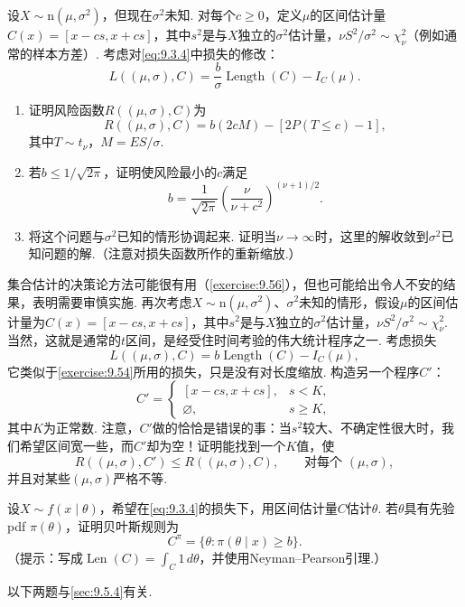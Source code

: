 \begin{exercise}\label{exercise:9.54}
设$X\sim\mathrm n(\mu,\sigma^2)$，但现在$\sigma^2$未知. 对每个$c\ge0$，定义$\mu$的区间估计量$C(x)=[x-cs,x+cs]$，其中$s^2$是与$X$独立的$\sigma^2$估计量，$\nu S^2/\sigma^2\sim\chi^2_\nu$（例如通常的样本方差）. 考虑对\eqref{eq:9.3.4}中损失的修改：
$$L((\mu,\sigma),C)=\frac b\sigma\operatorname{Length}(C)-I_C(\mu).$$
\begin{enumerate}
\item 证明风险函数$R((\mu,\sigma),C)$为
$$R((\mu,\sigma),C)=b(2cM)-[2P(T\le c)-1],$$
其中$T\sim t_\nu$，$M=ES/\sigma$.
\item 若$b\le1/\sqrt{2\pi}$，证明使风险最小的$c$满足
$$b=\frac1{\sqrt{2\pi}}\left(\frac\nu{\nu+c^2}\right)^{(\nu+1)/2}.$$
\item 将这个问题与$\sigma^2$已知的情形协调起来. 证明当$\nu\to\infty$时，这里的解收敛到$\sigma^2$已知问题的解.（注意对损失函数所作的重新缩放.）
\end{enumerate}
\end{exercise}
\begin{exercise}\label{exercise:9.55}
集合估计的决策论方法可能很有用（\autoref{exercise:9.56}），但也可能给出令人不安的结果，表明需要审慎实施. 再次考虑$X\sim\mathrm n(\mu,\sigma^2)$、$\sigma^2$未知的情形，假设$\mu$的区间估计量为$C(x)=[x-cs,x+cs]$，其中$s^2$是与$X$独立的$\sigma^2$估计量，$\nu S^2/\sigma^2\sim\chi^2_\nu$. 当然，这就是通常的$t$区间，是经受住时间考验的伟大统计程序之一. 考虑损失
$$L((\mu,\sigma),C)=b\operatorname{Length}(C)-I_C(\mu),$$
它类似于\autoref{exercise:9.54}所用的损失，只是没有对长度缩放. 构造另一个程序$C'$：
$$C'=\begin{cases}[x-cs,x+cs],&s<K,\\\varnothing,&s\ge K,\end{cases}$$
其中$K$为正常数. 注意，$C'$做的恰恰是错误的事：当$s^2$较大、不确定性很大时，我们希望区间宽一些，而$C'$却为空！证明能找到一个$K$值，使
$$R((\mu,\sigma),C')\le R((\mu,\sigma),C),\qquad\text{对每个 }(\mu,\sigma),$$
并且对某些$(\mu,\sigma)$严格不等.
\end{exercise}
\begin{exercise}\label{exercise:9.56}
设$X\sim f(x\mid\theta)$，希望在\eqref{eq:9.3.4}的损失下，用区间估计量$C$估计$\theta$. 若$\theta$具有先验pdf $\pi(\theta)$，证明贝叶斯规则为
$$C^\pi=\{\theta:\pi(\theta\mid x)\ge b\}.$$
（提示：写成$\operatorname{Len}(C)=\int_C1\,d\theta$，并使用Neyman--Pearson引理.）
\end{exercise}
以下两题与\autoref{sec:9.5.4}有关.
